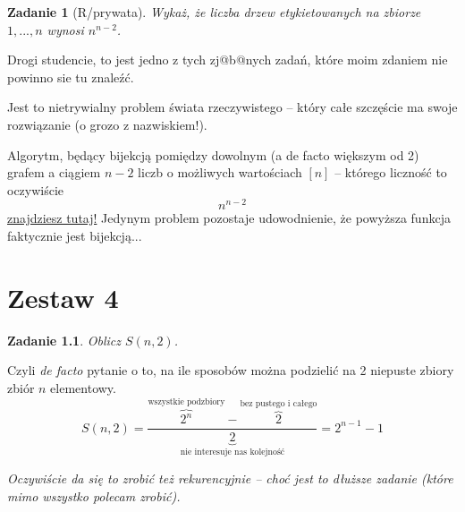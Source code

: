\documentclass{mwbk}
\newtheorem{zad}{Zadanie}[chapter]
\begin{document}
\begin{zad}[R/prywata]
    Wykaż, że liczba drzew etykietowanych na zbiorze ${1, ..., n}$ wynosi $n^{n-2}$.
\end{zad}
\begin{mdframed}
    Drogi studencie, to jest jedno z tych zj@b@nych zadań, które moim zdaniem
    nie powinno sie tu znaleźć.

    Jest to nietrywialny problem świata rzeczywistego -- który całe szczęście
    ma swoje rozwiązanie (o grozo z nazwiskiem!).

    Algorytm, będący bijekcją pomiędzy dowolnym (a de facto większym od 2) grafem
    a ciągiem $n-2$ liczb o możliwych wartościach $[n]$ -- którego liczność to oczywiście
    \[n^{n-2}\]
    \href{https://pl.wikipedia.org/wiki/Kod_Pr%C3%BCfera}{znajdziesz tutaj!}
    Jedynym problem pozostaje udowodnienie, że powyższa funkcja faktycznie jest bijekcją...
\end{mdframed}






\chapter{Zestaw 4}          %

\begin{zad}
    Oblicz $S(n, 2)$.
\end{zad}
\begin{mdframed}
    Czyli \textit{de facto} pytanie o to, na ile sposobów można podzielić
    na 2 niepuste zbiory zbiór $n$ elementowy.
    \[S(n, 2) = \frac{\overbrace{2^n}^{\text{wszystkie podzbiory}} - \overbrace{2}^{\text{bez pustego i całego}}}{\underbrace{2}_{\text{nie interesuje nas kolejność}}} = 2^{n-1}-1\]

    \textit{Oczywiście da się to zrobić też rekurencyjnie -- choć jest to dłuższe zadanie (które mimo wszystko polecam zrobić).}
\end{mdframed}
\end{document}
